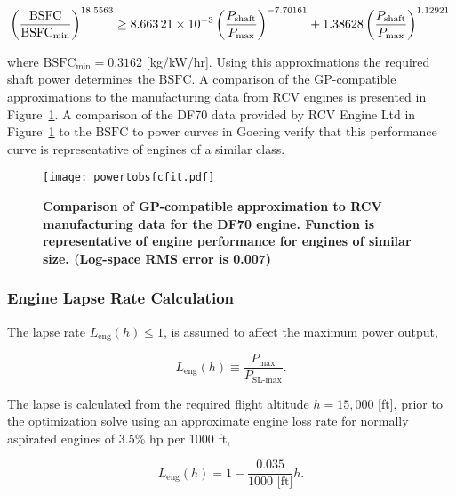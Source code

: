 \documentclass[]{aiaa-tc}%
\begin{document}
\begin{equation}
    \label{e:rpmtobsfc}
    \left( \frac{\text{BSFC}}{\text{BSFC}_{\text{min}}} \right)^{18.5563} \geq \num{8.66321d-3}\left( \frac{P_{\text{shaft}}}{P_{\text{max}}}\right)^{-7.70161} + 1.38628\left( \frac{P_{\text{shaft}}}{P_{\text{max}}} \right)^{1.12921} \\
\end{equation}

where $\text{BSFC}_{\text{min}} = 0.3162$ [kg/kW/hr].\cite{rcvengines}
Using this approximations the required shaft power determines the $\text{BSFC}$.
A comparison of the GP-compatible approximations to the manufacturing data from RCV engines is presented in Figure~\ref{f:powervsweightfit}. A comparison of the DF70 data provided by RCV Engine Ltd in Figure~\ref{f:powervsweightfit} to the $\text{BSFC}$ to power curves in Goering\cite{bsfcperf} verify that this performance curve is representative of engines of a similar class. 

\begin{figure}[H]
	\begin{center}
	\texttt{[image: powertobsfcfit.pdf]}
    \caption{\textbf{Comparison of GP-compatible approximation to RCV manufacturing data for the DF70 engine.  Function is representative of engine performance for engines of similar size.  (Log-space RMS error is 0.007) }}
	\label{f:powervsweightfit}
	\end{center}
\end{figure}

\subsubsection{Engine Lapse Rate Calculation}

The lapse rate $L_{\text{eng}}(h) \leq 1$, is assumed to affect the maximum power output,

\begin{equation}
    \label{e:lapse}
    L_{\text{eng}}(h) \equiv \frac{P_{\text{max}}}{P_{\text{SL-max}}}.
\end{equation}

The lapse is calculated from the required flight altitude $h=15,000$ [ft], prior to the optimization solve using an approximate engine loss rate for normally aspirated engines of 3.5\% hp per 1000 ft,\cite{enginelapse}

\begin{equation}
    \label{e:lapsefit}
    L_{\text{eng}}(h) = 1 - \frac{0.035}{1000 \text{ [ft]}} h.
\end{equation}
\end{document}
